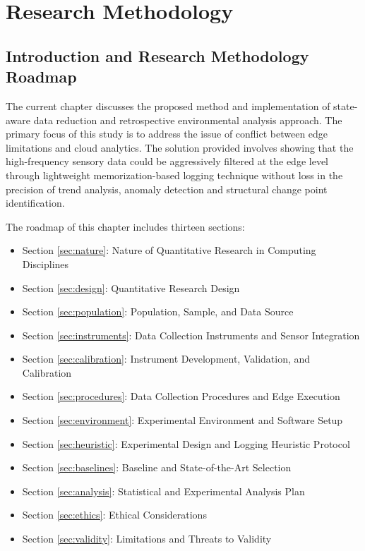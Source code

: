 \chapter{Research Methodology}
\label{ch:methodology}

\section{Introduction and Research Methodology Roadmap}
The current chapter discusses the proposed method and implementation of state-aware data reduction and retrospective environmental analysis approach. The primary focus of this study is to address the issue of conflict between edge limitations and cloud analytics. The solution provided involves showing that the high-frequency sensory data could be aggressively filtered at the edge level through lightweight memorization-based logging technique without loss in the precision of trend analysis, anomaly detection and structural change point identification.

 The roadmap of this chapter includes thirteen sections:
\begin{itemize}
    \item Section \ref{sec:nature}: Nature of Quantitative Research in Computing Disciplines
    \item Section \ref{sec:design}: Quantitative Research Design
    \item Section \ref{sec:population}: Population, Sample, and Data Source
    \item Section \ref{sec:instruments}: Data Collection Instruments and Sensor Integration
    \item Section \ref{sec:calibration}: Instrument Development, Validation, and Calibration
    \item Section \ref{sec:procedures}: Data Collection Procedures and Edge Execution
    \item Section \ref{sec:environment}: Experimental Environment and Software Setup
    \item Section \ref{sec:heuristic}: Experimental Design and Logging Heuristic Protocol
    \item Section \ref{sec:baselines}: Baseline and State-of-the-Art Selection
    \item Section \ref{sec:analysis}: Statistical and Experimental Analysis Plan
    \item Section \ref{sec:ethics}: Ethical Considerations
    \item Section \ref{sec:validity}: Limitations and Threats to Validity
\end{itemize}

